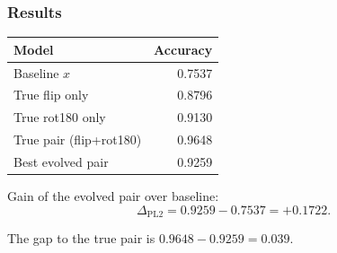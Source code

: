 \subsubsection{Results}

\begin{center}
\begin{tabular}{lr}
\toprule
Model & Accuracy \\
\midrule
Baseline $x$ & 0.7537 \\
True flip only & 0.8796 \\
True rot180 only & 0.9130 \\
True pair (flip+rot180) & 0.9648 \\
Best evolved pair & 0.9259 \\
\bottomrule
\end{tabular}
\end{center}

Gain of the evolved pair over baseline:
\[
\Delta_{\text{PL2}} = 0.9259 - 0.7537 = +0.1722.
\]

The gap to the true pair is $0.9648-0.9259=0.039$.
